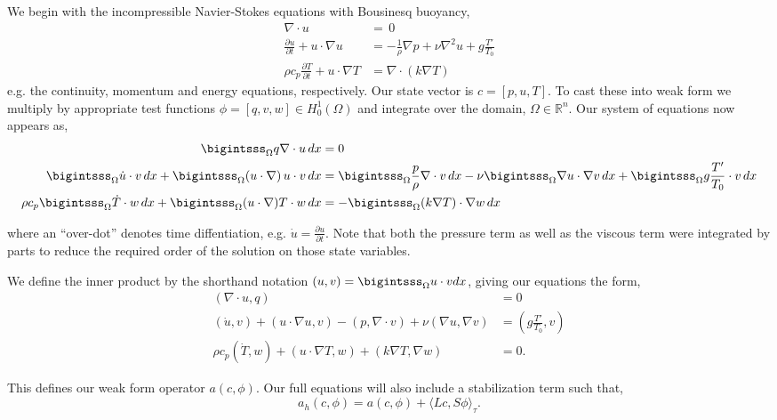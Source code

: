 We begin with the incompressible Navier-Stokes equations with Bousinesq
buoyancy,
\begin{align}
 \nabla \cdot u &= \, 0 \label{eq_cont}\\
 \frac{\partial u}{\partial t} + u \cdot \nabla u &= -\frac{1}{\rho}
 \nabla p + \nu \nabla^2 u + g \frac{T'}{T_0} \label{eq_mom}\\
 \rho c_p \frac{\partial T}{\partial t} + u \cdot \nabla T &= \nabla
 \cdot (k \nabla T) \label{eq_energy}
\end{align}
e.g. the continuity, momentum and energy equations, respectively. Our 
state vector is $c =  \left[p,u,T \right]$. To cast these into
weak form we multiply by appropriate test 
functions $\phi = \left[q,v,w \right] \in H^1_0(\Omega)$ and integrate over
the domain, $\Omega \in \mathbb{R}^n$. Our system of equations now
appears as, 
\begin{align}
  \bigintsss_\Omega q \nabla \cdot u \, dx &= 0 \\
 \bigintsss_\Omega \dot u \cdot v \, dx +
 \bigintsss_\Omega  (u \cdot \nabla) \, u \cdot v \, dx &=
 \bigintsss_\Omega \frac{p}{\rho} \nabla \cdot v \, dx - \nu \bigintsss_\Omega \nabla u \cdot \nabla v
 \,dx + \bigintsss_\Omega g \frac{T'}{T_0} \cdot v \, dx \\ 
 \rho c_p \bigintsss_\Omega \dot T \cdot w \, dx + \bigintsss_\Omega (u
 \cdot \nabla) T \cdot w \, dx  &= -\bigintsss_\Omega (k \nabla T) \cdot
 \nabla w \, dx
\end{align}

where an ``over-dot'' denotes time diffentiation, e.g. $\dot u =
\frac{\partial u}{\partial t}$. Note that both the pressure term as well
as the viscous term were integrated by parts to reduce the required
order of the solution on those state variables.  

We define the inner product by the shorthand notation $(u,v) =
\bigintsss_\Omega u\cdot v dx $, giving our equations the form,  
\begin{align}
 (\nabla \cdot u, q) &= 0 \\
 (\dot u,v) + (u \cdot \nabla u, v) - (p,\nabla \cdot v) + \nu (\nabla
 u, \nabla v) &= (g \frac{T'}{T_0},v) \\
 \rho c_p (\dot T,w) + (u \cdot \nabla T,w) + (k \nabla T,\nabla w) &= 0.
\end{align}

This defines our weak form operator $a(c,\phi)$. Our full equations will
also include a stabilization term such that,  
\begin{equation}
 a_h(c,\phi) = a(c,\phi) +  \langle Lc,S\phi \rangle_\tau. 
\end{equation}


